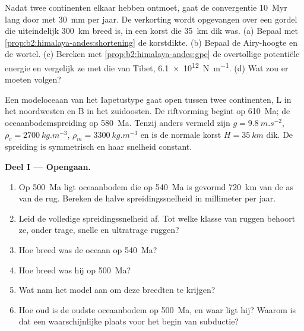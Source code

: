 \begin{exercise}[$\star\star\star$]\label{exo:b2:wilson-cycle:12}
Nadat twee continenten elkaar hebben ontmoet, gaat de convergentie \qty{10}{Myr} lang door met \qty{30}{mm} per jaar. De
verkorting wordt opgevangen over een gordel die uiteindelijk \qty{300}{km} breed is, in een korst die
\qty{35}{km} dik was. (a) Bepaal met \cref{prop:b2:himalaya-andes:shortening} de
korstdikte. (b) Bepaal de Airy-hoogte en de wortel. (c) Bereken met \cref{prop:b2:himalaya-andes:gpe}
de overtollige potentiële energie en vergelijk ze met die van Tibet, \qty{6.1e12}{N.m^{-1}}.
(d) Wat zou er moeten volgen?
\end{exercise}

\begin{problem}\label{pb:b2:wilson-cycle:1}
Een modeloceaan van het Iapetustype gaat open tussen twee continenten, L in het noordwesten en B in
het zuidoosten. De riftvorming begint op \qty{610}{Ma}; de oceaanbodemspreiding op \qty{580}{Ma}.
Tenzij anders vermeld zijn $g = \qty{9.8}{m.s^{-2}}$, $\rho_c = \qty{2700}{kg.m^{-3}}$, $\rho_m =
\qty{3300}{kg.m^{-3}}$ en is de normale korst $H = \qty{35}{km}$ dik. De spreiding is
symmetrisch en haar snelheid constant.

\medskip
\noindent\textbf{Deel I --- Opengaan.}
\begin{enumerate}
\item Op \qty{500}{Ma} ligt oceaanbodem die op \qty{540}{Ma} is gevormd \qty{720}{km} van de as van de
rug. Bereken de halve spreidingssnelheid in millimeter per jaar.
\item Leid de volledige spreidingssnelheid af. Tot welke klasse van ruggen behoort ze, onder trage,
snelle en ultratrage ruggen?
\item Hoe breed was de oceaan op \qty{540}{Ma}?
\item Hoe breed was hij op \qty{500}{Ma}?
\item Wat nam het model aan om deze breedten te krijgen?
\item Hoe oud is de oudste oceaanbodem op \qty{500}{Ma}, en waar ligt hij? Waarom is dat een
waarschijnlijke plaats voor het begin van subductie?
\end{enumerate}


\end{problem}
